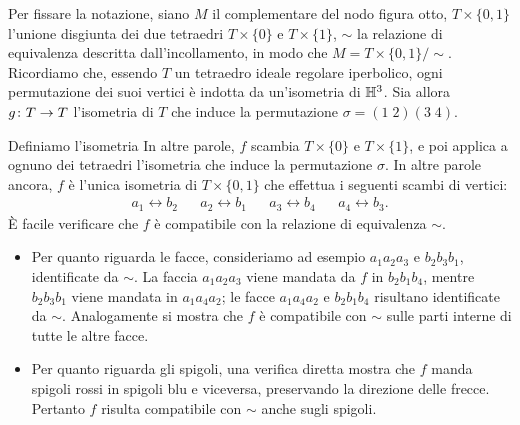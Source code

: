 Per fissare la notazione, siano $M$ il complementare del nodo figura otto, $T\times\{0,1\}$ l'unione disgiunta dei due tetraedri $T\times\{0\}$ e $T\times\{1\}$, $\sim$ la relazione di equivalenza descritta dall'incollamento, in modo che $M=T\times\{0,1\}/\sim$. Ricordiamo che, essendo $T$ un tetraedro ideale regolare iperbolico, ogni permutazione dei suoi vertici è indotta da un'isometria di $\mathbb{H}^3$. Sia allora $\map{g}{T}{T}$ l'isometria di $T$ che induce la permutazione $\sigma=(1\;2)(3\;4)$.
\begin{center}
\end{center}
Definiamo l'isometria
In altre parole, $f$ scambia $T\times\{0\}$ e $T\times\{1\}$, e poi applica a ognuno dei tetraedri l'isometria che induce la permutazione $\sigma$. In altre parole ancora, $f$ è l'unica isometria di $T\times\{0,1\}$ che effettua i seguenti scambi di vertici:
\begin{align*}
a_1\leftrightarrow b_2&&a_2\leftrightarrow b_1&&a_3\leftrightarrow b_4&&a_4\leftrightarrow b_3.
\end{align*}
È facile verificare che $f$ è compatibile con la relazione di equivalenza $\sim$.
\begin{itemize}
\item Per quanto riguarda le facce, consideriamo ad esempio $a_1a_2a_3$ e $b_2b_3b_1$, identificate da $\sim$. La faccia $a_1a_2a_3$ viene mandata da $f$ in $b_2b_1b_4$, mentre $b_2b_3b_1$ viene mandata in $a_1a_4a_2$; le facce $a_1a_4a_2$ e $b_2b_1b_4$ risultano identificate da $\sim$. Analogamente si mostra che $f$ è compatibile con $\sim$ sulle parti interne di tutte le altre facce.
\item Per quanto riguarda gli spigoli, una verifica diretta mostra che $f$ manda spigoli rossi in spigoli blu e viceversa, preservando la direzione delle frecce. Pertanto $f$ risulta compatibile con $\sim$ anche sugli spigoli.
\end{itemize}
